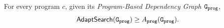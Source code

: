 \begin{thm}
    \label{thm:sound_adaptalg}
    For every program $c$, given its \emph{Program-Based Dependency Graph} $\mathtt{{G_{prog}}}$,
     $$\mathsf{AdaptSearch}(\mathtt{{G_{prog}}}) \geq A_{\mathtt{prog}}(\mathtt{{G_{prog}}}).$$
\end{thm}
% 
